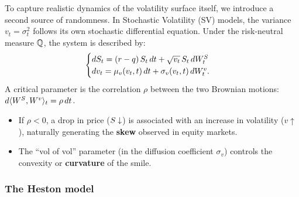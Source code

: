 To capture realistic dynamics of the volatility surface itself, we introduce a second source of randomness. In Stochastic Volatility (SV) models, the variance $v_t = \sigma_t^2$ follows its own stochastic differential equation. Under the risk-neutral measure $\mathbb{Q}$, the system is described by:
\begin{equation}
    \begin{cases}
        dS_t = (r-q)\,S_t\,dt + \sqrt{v_t}\,S_t\,dW_t^{S} \\
        dv_t = \mu_v(v_t, t)\,dt + \sigma_v(v_t, t)\,dW_t^{v}.
    \end{cases}
\end{equation}
 A critical parameter is the correlation $\rho$ between the two Brownian motions: $d\langle W^{S}, W^{v} \rangle_t = \rho\,dt$.
\begin{itemize}
    \item If $\rho < 0$, a drop in price ($S \downarrow$) is associated with an increase in volatility ($v \uparrow$), naturally generating the \textbf{skew} observed in equity markets.
    \item The ``vol of vol'' parameter (in the diffusion coefficient $\sigma_v$) controls the convexity or \textbf{curvature} of the smile.
\end{itemize}

\subsubsection*{The Heston model}

